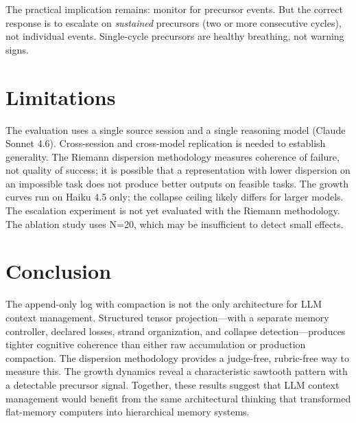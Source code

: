 \documentclass[11pt]{article}
\begin{document}
The practical implication remains: monitor for precursor events. But
the correct response is to escalate on \emph{sustained} precursors
(two or more consecutive cycles), not individual events. Single-cycle
precursors are healthy breathing, not warning signs.

\section{Limitations}

The evaluation uses a single source session and a single reasoning
model (Claude Sonnet 4.6). Cross-session and cross-model replication
is needed to establish generality. The Riemann dispersion methodology
measures coherence of failure, not quality of success; it is possible
that a representation with lower dispersion on an impossible task does
not produce better outputs on feasible tasks. The growth curves run on
Haiku 4.5 only; the collapse ceiling likely differs for larger models.
The escalation experiment is not yet evaluated with the Riemann
methodology. The ablation study uses N=20, which may be insufficient
to detect small effects.

\section{Conclusion}

The append-only log with compaction is not the only architecture for
LLM context management. Structured tensor projection---with a
separate memory controller, declared losses, strand organization, and
collapse detection---produces tighter cognitive coherence than either
raw accumulation or production compaction. The dispersion methodology
provides a judge-free, rubric-free way to measure this. The growth
dynamics reveal a characteristic sawtooth pattern with a detectable
precursor signal. Together, these results suggest that LLM context
management would benefit from the same architectural thinking that
transformed flat-memory computers into hierarchical memory systems.



\end{document}
